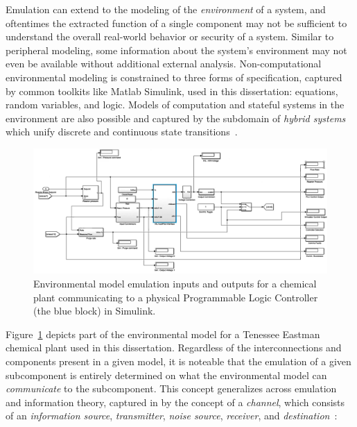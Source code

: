 Emulation can extend to the modeling of the \emph{environment} of a system, and oftentimes the extracted function of a single component may not be sufficient to understand the overall real-world behavior or security of a system.
Similar to peripheral modeling, some information about the system's environment may not even be available without additional external analysis.
Non-computational environmental modeling is constrained to three forms of specification, captured by common toolkits like Matlab Simulink, used in this dissertation: equations, random variables, and logic.
Models of computation and stateful systems in the environment are also possible and captured by the subdomain of \emph{hybrid systems} which unify discrete and continuous state transitions~\cite{henzinger1996theory}.

\begin{figure}
\centering
\includegraphics[width=\textwidth]{envir-model.pdf}
\caption{Environmental model emulation inputs and outputs for a chemical plant communicating to a physical Programmable Logic Controller (the blue block) in Simulink.}
\label{fig:envir-model}
\end{figure}

Figure~\ref{fig:envir-model} depicts part of the environmental model for a Tenessee Eastman chemical plant used in this dissertation.
Regardless of the interconnections and components present in a given model, it is noteable that the emulation of a given subcomponent is entirely determined on what the environmental model can \emph{communicate} to the subcomponent.
This concept generalizes across emulation and information theory, captured in by the concept of a \emph{channel}, which consists of an \emph{information source}, \emph{transmitter}, \emph{noise source}, \emph{receiver}, and \emph{destination}~\cite{shannon1948mathematical}:


